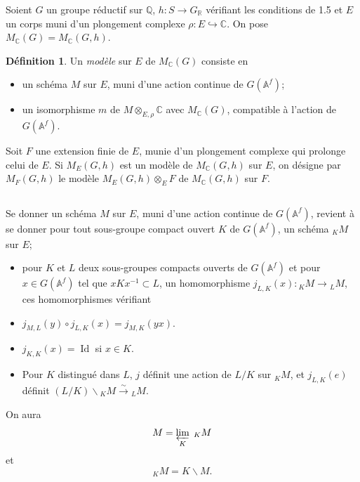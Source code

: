 \documentclass[11pt]{amsart}
\theoremstyle{plain}
\theoremstyle{definition}
\newtheorem{definition}[theorem]{D\'efinition}
\DeclareMathOperator{\Id}{Id}
\newcommand{\QQ}{\mathbb{Q}}
\newcommand{\RR}{\mathbb{R}}
\newcommand{\CC}{\mathbb{C}}
\newcommand{\AAf}{\mathbb{A}^f}
\newcommand{\MC}{M_{\mathbb{C}}}
\begin{document}
Soient $G$ un groupe r\'eductif sur $\QQ$, $h : S \to G_{\RR}$ v\'erifiant les conditions de 1.5 et $E$ un corps muni d'un plongement complexe $\rho : E \hookrightarrow \CC$. On pose $\MC(G) = \MC(G,h)$.

\begin{definition}
Un \emph{mod\`ele} sur $E$ de $\MC(G)$ consiste en
\begin{itemize}
\item[(a)] un sch\'ema $M$ sur $E$, muni d'une action continue de $G(\AAf)$;
\item[(b)] un isomorphisme $m$ de $M \otimes_{E,\rho} \CC$ avec $\MC(G)$, compatible \`a l'action de $G(\AAf)$.
\end{itemize}
\end{definition}

Soit $F$ une extension finie de $E$, munie d'un plongement complexe qui prolonge celui de $E$. Si $M_E(G,h)$ est un mod\`ele de $\MC(G,h)$ sur $E$, on d\'esigne par $M_F(G,h)$ le mod\`ele $M_E(G,h) \otimes_E F$ de $\MC(G,h)$ sur $F$.

\subsection{}

Se donner un sch\'ema $M$ sur $E$, muni d'une action continue de $G(\AAf)$, revient \`a se donner pour tout sous-groupe compact ouvert $K$ de $G(\AAf)$, un sch\'ema ${}_K M$ sur $E$;
\begin{itemize}
\item[(a)] pour $K$ et $L$ deux sous-groupes compacts ouverts de $G(\AAf)$ et pour $x \in G(\AAf)$ tel que $x K x^{-1} \subset L$, un homomorphisme $j_{L,K}(x) : {}_K M \to {}_L M$, ces homomorphismes v\'erifiant
\item[$(\alpha)$] $j_{M,L}(y) \circ j_{L,K}(x) = j_{M,K}(yx)$.
\item[$(\beta)$] $j_{K,K}(x) = \Id$ si $x \in K$.
\item[$(\gamma)$] Pour $K$ distingu\'e dans $L$, $j$ d\'efinit une action de $L/K$ sur ${}_K M$, et $j_{L,K}(e)$ d\'efinit $(L/K) \backslash {}_K M \xrightarrow{\sim} {}_L M$.
\end{itemize}

On aura
\begin{equation}\label{eq:3.2.1}
M = \varprojlim_K \; {}_K M
\end{equation}
et
\begin{equation}\label{eq:3.2.2}
{}_K M = K \backslash M.
\end{equation}
\end{document}
